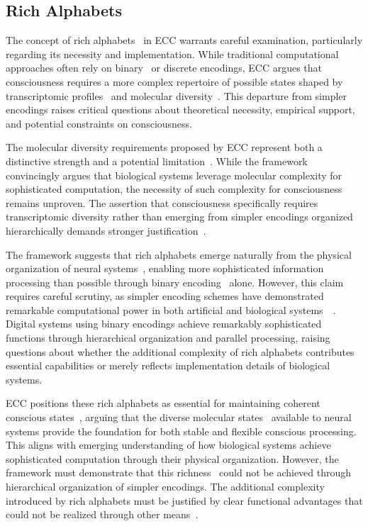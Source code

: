 \subsection*{Rich Alphabets~}

The concept of rich alphabets~ in ECC warrants careful examination, particularly regarding its necessity and implementation. While traditional computational approaches often rely on binary~ or discrete encodings, ECC argues that consciousness requires a more complex repertoire of possible states shaped by transcriptomic profiles~ and molecular diversity~. This departure from simpler encodings raises critical questions about theoretical necessity, empirical support, and potential constraints on consciousness.

The molecular diversity requirements proposed by ECC represent both a distinctive strength and a potential limitation~\cite{dennett2017bacteria, thompson2014waking}. While the framework convincingly argues that biological systems leverage molecular complexity for sophisticated computation, the necessity of such complexity for consciousness remains unproven. The assertion that consciousness specifically requires transcriptomic diversity rather than emerging from simpler encodings organized hierarchically demands stronger justification~\cite{noe2009out, gibson2015ecological}.

The framework suggests that rich alphabets emerge naturally from the physical organization of neural systems~, enabling more sophisticated information processing than possible through binary encoding~ alone. However, this claim requires careful scrutiny, as simpler encoding schemes have demonstrated remarkable computational power in both artificial and biological systems~~\cite{chalmers2010character}. Digital systems using binary encodings achieve remarkably sophisticated functions through hierarchical organization and parallel processing, raising questions about whether the additional complexity of rich alphabets contributes essential capabilities or merely reflects implementation details of biological systems.

ECC positions these rich alphabets as essential for maintaining coherent conscious states~, arguing that the diverse molecular states~ available to neural systems provide the foundation for both stable and flexible conscious processing. This aligns with emerging understanding of how biological systems achieve sophisticated computation through their physical organization. However, the framework must demonstrate that this richness~ could not be achieved through hierarchical organization of simpler encodings. The additional complexity introduced by rich alphabets must be justified by clear functional advantages that could not be realized through other means~\cite{koch2019feeling, rovelli2018order}.

